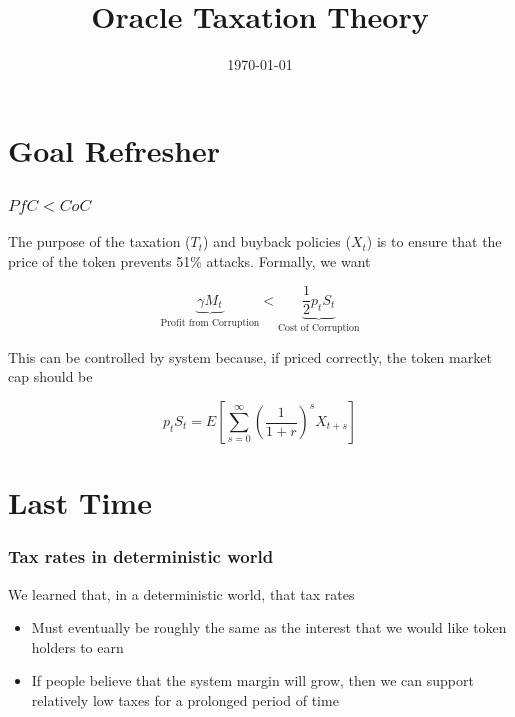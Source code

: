 \documentclass[10pt]{beamer}
\title{Oracle Taxation Theory}
\date[]{\today}
\begin{document}
\begin{frame}
  \titlepage
\end{frame}


\section{Goal Refresher}

  \begin{frame} \frametitle{$PfC < CoC$}

    The purpose of the taxation ($T_t$) and buyback policies ($X_t$) is to ensure that the price of
    the token prevents 51\% attacks. Formally, we want

    $$\underbrace{\gamma M_t}_{\text{Profit from Corruption}} < \underbrace{\frac{1}{2} p_t S_t}_{\text{Cost of Corruption}}$$

    This can be controlled by system because, if priced correctly, the token market cap should be

    $$p_t S_t = E \left[ \sum_{s=0}^{\infty} \left(\frac{1}{1 + r}\right)^s X_{t+s} \right]$$

  \end{frame}

\section{Last Time}

  \begin{frame} \frametitle{Tax rates in deterministic world}

    We learned that, in a deterministic world, that tax rates

    \begin{itemize}
      \item Must eventually be roughly the same as the interest that we would like token holders to
            earn
      \item If people believe that the system margin will grow, then we can support relatively low
            taxes for a prolonged period of time
    \end{itemize}

  \end{frame}

\end{document}
